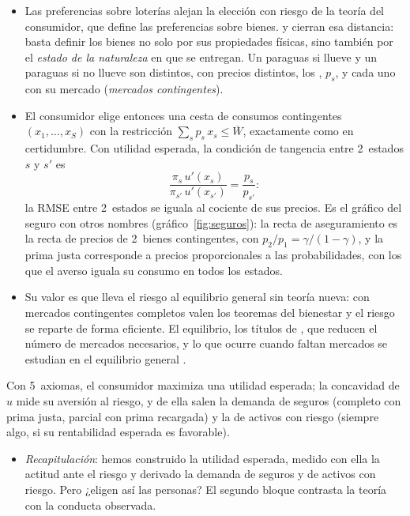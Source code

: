 \documentclass[11pt]{article}
\begin{document}
\begin{itemize}
\item Las preferencias sobre loterías alejan la elección con riesgo de la teoría del consumidor, que define las preferencias sobre bienes. \textcite{Arrow1953Role} y \textcite[cap.~7]{Debreu1959Theory} cierran esa distancia: basta definir los bienes no solo por sus propiedades físicas, sino también por el \emph{estado de la naturaleza} en que se entregan. Un paraguas si llueve y un paraguas si no llueve son  distintos, con precios distintos, los , $p_s$, y cada uno con su mercado (\emph{mercados contingentes}).
\item El consumidor elige entonces una cesta de consumos contingentes $(x_1,\dots,x_S)$ con la restricción $\sum_s p_s\,x_s\leq\overline{W}$, exactamente como en certidumbre. Con utilidad esperada, la condición de tangencia entre 2~estados $s$ y $s'$ es
  \begin{equation}\label{eq:precios-estado}
  \frac{\pi_s\,u'(x_s)}{\pi_{s'}\,u'(x_{s'})}=\frac{p_s}{p_{s'}} :
  \end{equation}
  la RMSE entre 2~estados se iguala al cociente de sus precios. Es el gráfico del seguro con otros nombres (gráfico~\ref{fig:seguros}): la recta de aseguramiento es la recta de precios de 2~bienes contingentes, con $p_2/p_1=\gamma/(1-\gamma)$, y la prima justa corresponde a precios proporcionales a las probabilidades, con los que el averso iguala su consumo en todos los estados.
\item Su valor es que lleva el riesgo al equilibrio general sin teoría nueva: con mercados contingentes completos valen los teoremas del bienestar y el riesgo se reparte de forma eficiente. El equilibrio, los títulos de , que reducen el número de mercados necesarios\nocite{Arrow1964Role}, y lo que ocurre cuando faltan mercados se estudian en el equilibrio general .
\end{itemize}

\begin{ideaclave}
Con 5~axiomas, el consumidor maximiza una utilidad esperada; la concavidad de $u$ mide su aversión al riesgo, y de ella salen la demanda de seguros (completo con prima justa, parcial con prima recargada) y la de activos con riesgo (siempre algo, si su rentabilidad esperada es favorable).
\end{ideaclave}

\begin{itemize}
\item \emph{Recapitulación}: hemos construido la utilidad esperada, medido con ella la actitud ante el riesgo y derivado la demanda de seguros y de activos con riesgo. Pero ¿eligen así las personas? El segundo bloque contrasta la teoría con la conducta observada.
\end{itemize}
\end{document}
